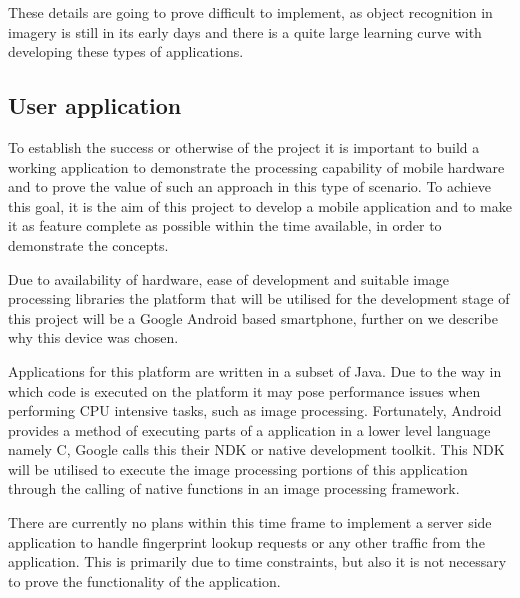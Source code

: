 These details are going to prove difficult to implement, as object recognition in imagery is still in its early days and there is a quite large learning curve with developing these types of applications. 

\subsection*{User application}
To establish the success or otherwise of the project it is important to build a working application to demonstrate the processing capability of mobile hardware and to prove the value of such an approach in this type of scenario. To achieve this goal, it is the aim of this project to develop a mobile application and to make it as feature complete as possible within the time available, in order to demonstrate the concepts.

Due to availability of hardware, ease of development and suitable image processing libraries the platform that will be utilised for the development stage of this project will be a Google Android\textsuperscript{\texttrademark} based smartphone, further on we describe why this device was chosen.

Applications for this platform are written in a subset of Java\textsuperscript{\texttrademark}. Due to the way in which code is executed on the platform it may pose performance issues when performing CPU intensive tasks, such as image processing. Fortunately, Android provides a method of executing parts of a application in a lower level language namely C, Google calls this their NDK or native development toolkit. This NDK will be utilised to execute the image processing portions of this application through the calling of native functions in an image processing framework.

There are currently no plans within this time frame to implement a server side application to handle fingerprint lookup requests or any other traffic from the application. This is primarily due to time constraints, but also it is not necessary to prove the functionality of the application.
